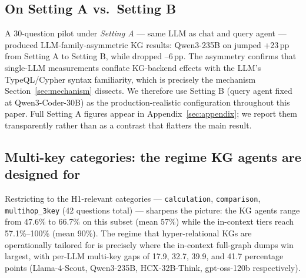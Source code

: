 \subsection{On Setting A vs.\ Setting B}

A 30-question pilot under \emph{Setting A} — same LLM as chat and
query agent — produced LLM-family-asymmetric KG results: Qwen3-235B
on  jumped +23\,pp from Setting A to Setting B,
while  dropped --6\,pp. The asymmetry confirms
that single-LLM measurements conflate KG-backend effects with the
LLM's TypeQL/Cypher syntax familiarity, which is precisely the
mechanism Section~\ref{sec:mechanism} dissects. We therefore use
Setting B (query agent fixed at Qwen3-Coder-30B) as the
production-realistic configuration throughout this paper. Full
Setting A figures appear in Appendix~\ref{sec:appendix}; we report
them transparently rather than as a contrast that flatters the
main result.

\subsection{Multi-key categories: the regime KG agents are designed for}

Restricting to the H1-relevant categories — \texttt{calculation},
\texttt{comparison}, \texttt{multihop\_3key} (42 questions total) —
sharpens the picture: the KG agents range from 47.6\% to 66.7\%
on this subset (mean 57\%) while the in-context tiers reach
57.1\%--100\% (mean 90\%). The regime that hyper-relational KGs are
operationally tailored for is precisely where the in-context
full-graph dumps win largest, with per-LLM multi-key gaps of
17.9, 32.7, 39.9, and 41.7 percentage points (Llama-4-Scout,
Qwen3-235B, HCX-32B-Think, gpt-oss-120b respectively).
